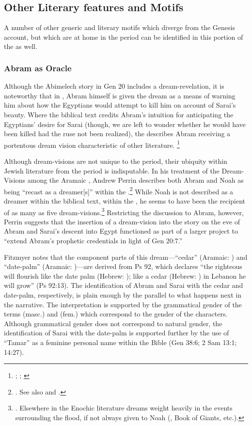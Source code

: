 \subsection{Other Literary features and Motifs}
A number of other generic and literary motifs which diverge from the Genesis account, but which are at home in the \secondtemple period can be identified in this portion of the \ga as well.

\subsubsection{Abram as Oracle}
Although the Abimelech story in Gen 20 includes a dream-revelation, it is noteworthy that in \ga, Abram himself is given the dream as a means of warning him about how the Egyptians would attempt to kill him on account of Sarai's beauty. Where the biblical text credits Abram's intuition for anticipating the Egyptians' desire for Sarai (though, we are left to wonder whether he would have been killed had the ruse not been realized), the \ga describes Abram receiving a portentous dream vision characteristic of other \secondtemple literature.%
%
\footnote{\cite{gevirtz_maarav1992}; \cite[184]{fitzmyer2004}; \cite{dacy_tzoref2013}}
%

Although dream-visions are not unique to the \secondtemple period, their ubiquity within Jewish literature from the \secondtemple period is indisputable. In his treatment of the Dream-Visions among the Aramaic \dss, Andrew Perrin describes both Abram and Noah as being ``recast as a dreamer[s]'' within the \ga.\footnote{\cite[52--57]{perrin2015}. See also \cite{eshel_klostergaard-etal2009} and \cite{machiela_falk-etal2010}.} While Noah is not described as a dreamer within the biblical text, within the \ga, he seems to have been the recipient of as many as five dream-visions.\footnote{\cite[53]{perrin2015}. Elsewhere in the Enochic literature dreams weight heavily in the events surrounding the flood, if not always given to Noah (\firstenoch, Book of Giants, etc.).} Restricting the discussion to Abram, however, Perrin suggests that the insertion of a dream-vision into the story on the eve of Abram and Sarai's descent into Egypt functioned as part of a larger project to ``extend Abram's prophetic credentials in light of Gen 20:7.''\autocite[55]{perrin2015} 

Fitzmyer notes that the component parts of this dream---``cedar'' (Aramaic: ) and ``date-palm'' (Aramaic: )---are derived from Ps 92, which declares ``the righteous will flourish like the date palm (Hebrew: ); like a cedar (Hebrew: ) in Lebanon he will grow'' (Ps 92:13). The identification of Abram and Sarai with the cedar and date-palm, respectively, is plain enough by the parallel to what happens next in the narrative. The interpretation is supported by the grammatical gender of the terms  (masc.) and  (fem.) which correspond to the gender of the characters. Although grammatical gender does not correspond to natural gender, the identification of Sarai with the date-palm is supported further by the use of ``Tamar'' as a feminine personal name within the Bible (Gen 38:6; 2 Sam 13:1; 14:27).

